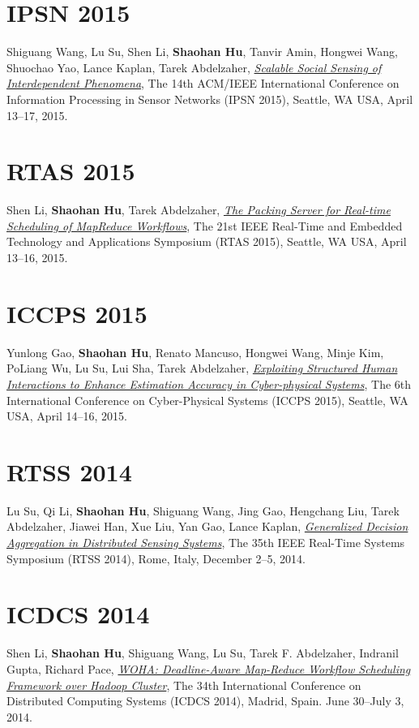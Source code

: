 \section{\sc IPSN 2015}\hypertarget{wang2015ipsn}{} Shiguang Wang, Lu Su, Shen Li, \textbf{Shaohan Hu}, Tanvir Amin, Hongwei Wang, Shuochao Yao, Lance Kaplan, Tarek Abdelzaher, \href{http://dl.acm.org/citation.cfm?id=2737114}{\emph{Scalable Social Sensing of Interdependent Phenomena}}, \textsf{The 14th ACM/IEEE International Conference on Information Processing in Sensor Networks (IPSN 2015)}, Seattle, WA USA, April 13--17, 2015.

\section{\sc RTAS 2015}\hypertarget{li2015rtas}{} Shen Li, \textbf{Shaohan Hu}, Tarek Abdelzaher, \href{http://ieeexplore.ieee.org/xpl/articleDetails.jsp?tp=&arnumber=7108416}{\emph{The Packing Server for Real-time Scheduling of MapReduce Workflows}}, \textsf{The 21st IEEE Real-Time and Embedded Technology and Applications Symposium (RTAS 2015)}, Seattle, WA USA, April 13--16, 2015.

\section{\sc ICCPS 2015}\hypertarget{gao2015iccps}{} Yunlong Gao, \textbf{Shaohan Hu}, Renato Mancuso, Hongwei Wang, Minje Kim, PoLiang Wu, Lu Su, Lui Sha, Tarek Abdelzaher, \href{http://dl.acm.org/citation.cfm?id=2735960.2735965}{\emph{Exploiting Structured Human Interactions to Enhance Estimation Accuracy in Cyber-physical Systems}}, \textsf{The 6th International Conference on Cyber-Physical Systems (ICCPS 2015)}, Seattle, WA USA, April 14--16, 2015.

\section{\sc RTSS 2014}\hypertarget{su2014rtss}{} Lu Su, Qi Li, \textbf{Shaohan Hu}, Shiguang Wang, Jing Gao, Hengchang Liu, Tarek Abdelzaher, Jiawei Han, Xue Liu, Yan Gao, Lance Kaplan, \href{http://ieeexplore.ieee.org/xpl/articleDetails.jsp?arnumber=7010369}{\emph{Generalized Decision Aggregation in Distributed Sensing Systems}}, \textsf{The 35th IEEE Real-Time Systems Symposium (RTSS 2014)}, Rome, Italy, December 2--5, 2014.

\section{\sc ICDCS 2014}\hypertarget{li2014icdcs}{} Shen Li, \textbf{Shaohan Hu}, Shiguang Wang, Lu Su, Tarek F. Abdelzaher, Indranil Gupta, Richard Pace, \href{http://ieeexplore.ieee.org/xpl/articleDetails.jsp?arnumber=6888886}{\emph{WOHA: Deadline-Aware Map-Reduce Workflow Scheduling Framework over Hadoop Cluster}}, \textsf{The 34th International Conference on Distributed Computing Systems (ICDCS 2014)}, Madrid, Spain. June 30--July 3, 2014.

